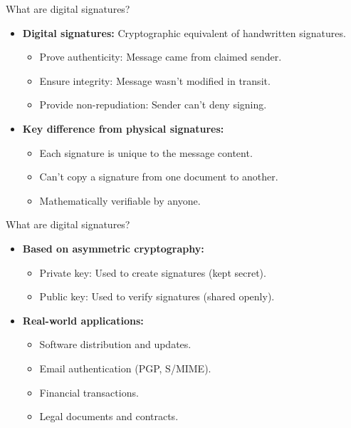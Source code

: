 \documentclass[aspectratio=169, lualatex, handout]{beamer}
\begin{document}
\begin{frame}{What are digital signatures?}
	\begin{itemize}
		\item \textbf{Digital signatures:} Cryptographic equivalent of handwritten signatures.
		      \begin{itemize}
			      \item Prove authenticity: Message came from claimed sender.
			      \item Ensure integrity: Message wasn't modified in transit.
			      \item Provide non-repudiation: Sender can't deny signing.
		      \end{itemize}
		\item \textbf{Key difference from physical signatures:}
		      \begin{itemize}
			      \item Each signature is unique to the message content.
			      \item Can't copy a signature from one document to another.
			      \item Mathematically verifiable by anyone.
		      \end{itemize}
	\end{itemize}
\end{frame}

\begin{frame}{What are digital signatures?}
	\begin{itemize}
		\item \textbf{Based on asymmetric cryptography:}
		      \begin{itemize}
			      \item Private key: Used to create signatures (kept secret).
			      \item Public key: Used to verify signatures (shared openly).
		      \end{itemize}
		\item \textbf{Real-world applications:}
		      \begin{itemize}
			      \item Software distribution and updates.
			      \item Email authentication (PGP, S/MIME).
			      \item Financial transactions.
			      \item Legal documents and contracts.
		      \end{itemize}
	\end{itemize}
\end{frame}
\end{document}
